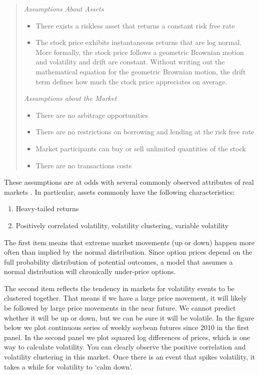 \documentclass[
  letterpaper,
  DIV=11,
  numbers=noendperiod]{scrreprt}
\providecommand{\tightlist}{%
  \setlength{\itemsep}{0pt}\setlength{\parskip}{0pt}}\usepackage{longtable,booktabs,array}
\begin{document}
\begin{quote}
\emph{Assumptions About Assets}

\begin{itemize}
\item
  There exists a riskless asset that returns a constant risk free rate
\item
  The stock price exhibits instantaneous returns that are log normal.
  More formally, the stock price follows a geometric Brownian motion and
  volatility and drift are constant. Without writing out the
  mathematical equation for the geometric Brownian motion, the drift
  term defines how much the stock price appreciates on average.
\end{itemize}

\emph{Assumptions about the Market}

\begin{itemize}
\item
  There are no arbitrage opportunities
\item
  There are no restrictions on borrowing and lending at the risk free
  rate
\item
  Market participants can buy or sell unlimited quantities of the stock
\item
  There are no transactions costs
\end{itemize}
\end{quote}

These assumptions are at odds with several commonly observed attributes
of real markets . In particular, assets commonly have the following
characteristics:

\begin{enumerate}
\def\labelenumi{\arabic{enumi}.}
\tightlist
\item
  Heavy-tailed returns
\item
  Positively correlated volatility, volatility clustering, variable
  volatility
\end{enumerate}

The first item means that extreme market movements (up or down) happen
more often than implied by the normal distribution. Since option prices
depend on the full probability distribution of potential outcomes, a
model that assumes a normal distribution will chronically under-price
options.

The second item reflects the tendency in markets for volatility events
to be clustered together. That means if we have a large price movement,
it will likely be followed by large price movements in the near future.
We cannot predict whether it will be up or down, but we can be sure it
will be volatile. In the figure below we plot continuous series of
weekly soybean futures since 2010 in the first panel. In the second
panel we plot squared log differences of prices, which is one way to
calculate volatility. You can clearly observe the positive correlation
and volatility clustering in this market. Once there is an event that
spikes volatility, it takes a while for volatility to `calm down'.
\end{document}
